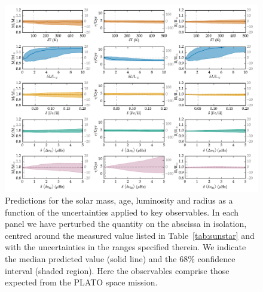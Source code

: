 \begin{figure}
    \centering
    \includegraphics[width=0.95\textheight,height=0.95\textwidth,keepaspectratio, angle=90]{plato2.pdf}
    \caption{Predictions for the solar mass, age, luminosity and radius as a function of the uncertainties applied to key observables. In each panel we have perturbed the quantity on the abscissa in isolation, centred around the measured value listed in  Table~\ref{tab:sunstar} and with the uncertainties in the ranges specified therein. We indicate the median predicted value (solid line) and the  $68\%$  confidence interval (shaded region). Here the observables comprise those expected from the PLATO space mission.} 
    \label{fig:uncertplato}
\end{figure}
\fi

%


